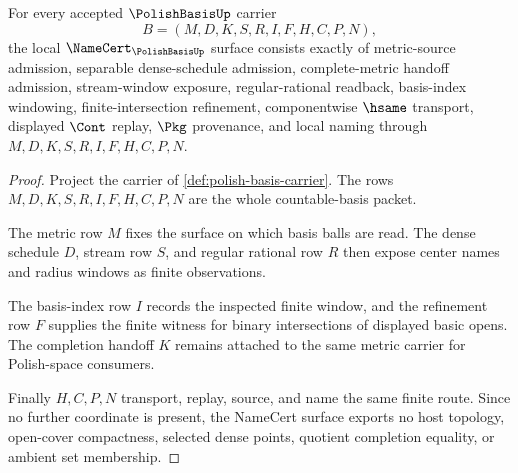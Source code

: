 \begin{theorem}
\label{thm:polish-basis-namecert-obligations}
For every accepted $\PolishBasisUp$ carrier
$$
B=(M,D,K,S,R,I,F,H,C,P,N),
$$
the local $\NameCert_{\PolishBasisUp}$ surface consists exactly of metric-source admission, separable dense-schedule admission, complete-metric handoff admission, stream-window exposure, regular-rational readback, basis-index windowing, finite-intersection refinement, componentwise $\hsame$ transport, displayed $\Cont$ replay, $\Pkg$ provenance, and local naming through $M,D,K,S,R,I,F,H,C,P,N$.
\end{theorem}
\begin{proof}
Project the carrier of \autoref{def:polish-basis-carrier}. The rows $M,D,K,S,R,I,F,H,C,P,N$ are the whole countable-basis packet.

The metric row $M$ fixes the surface on which basis balls are read. The dense schedule $D$, stream row $S$, and regular rational row $R$ then expose center names and radius windows as finite observations.

The basis-index row $I$ records the inspected finite window, and the refinement row $F$ supplies the finite witness for binary intersections of displayed basic opens. The completion handoff $K$ remains attached to the same metric carrier for Polish-space consumers.

Finally $H,C,P,N$ transport, replay, source, and name the same finite route. Since no further coordinate is present, the NameCert surface exports no host topology, open-cover compactness, selected dense points, quotient completion equality, or ambient set membership.
\end{proof}

